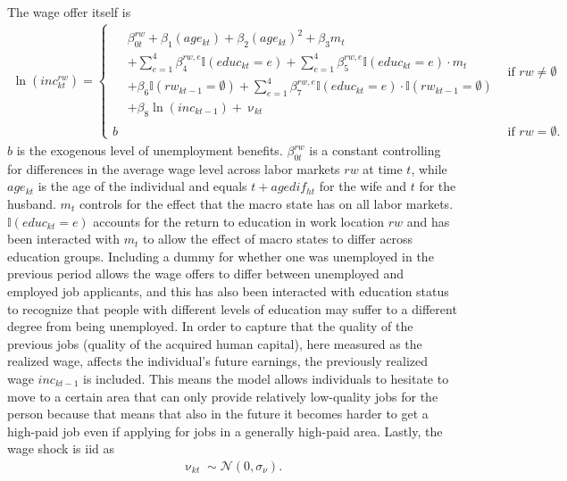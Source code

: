 The wage offer itself is
\begin{align}
\ln(inc_{kt}^{rw}) = 
\begin{cases} 
    \!\begin{aligned}%
       & \beta_{0t}^{rw} +\beta_1 (age_{kt}) + \beta_2(age_{kt})^2 + \beta_3 m_t \\
       & + \sum_{e=1}^{4}{\beta_4^{rw,e} \mathbb{I}{(educ_{kt}=e)}} + \sum_{e=1}^{4}{\beta_5^{rw,e} \mathbb{I}{(educ_{kt}=e)}\cdot m_t} \\
       & + \beta_6\mathbb{I}{(rw_{kt-1}=\emptyset)} + \sum_{e=1}^{4}{\beta_7^{rw,e} \mathbb{I}{(educ_{kt}=e)}\cdot \mathbb{I}{(rw_{kt-1}=\emptyset)}} \\
       & +\beta_8 \ln(inc_{kt-1}) + \upnu_{kt} 
    \end{aligned}           &  \text{if } rw\neq\emptyset \\%
    b & \text{if } rw=\emptyset. 
\end{cases}
\label{eq:inc}
\end{align}
$b$ is the exogenous level of unemployment benefits. $\beta_{0t}^{rw}$ is a constant controlling for differences in the average wage level across labor markets $rw$ at time $t$, while $age_{kt}$ is the age of the individual and equals $t+agedif_{ht}$ for the wife and $t$ for the husband. $m_t$ controls for the effect that the macro state has on all labor markets. $\mathbb{I}{(educ_{kt}=e)}$ accounts for the return to education in work location $rw$ and has been interacted with $m_t$ to allow the effect of macro states to differ across education groups. Including a dummy for whether one was unemployed in the previous period allows the wage offers to differ between unemployed and employed job applicants, and this has also been interacted with education status to recognize that people with different levels of education may suffer to a different degree from being unemployed. In order to capture that the quality of the previous jobs (quality of the acquired human capital), here measured as the realized wage, affects the individual's future earnings, the previously realized wage $inc_{kt-1}$ is included. This means the model allows individuals to hesitate to move to a certain area that can only provide relatively low-quality jobs for the person because that means that also in the future it becomes harder to get a high-paid job even if applying for jobs in a generally high-paid area. Lastly, the wage shock is iid as
\begin{align*}
\upnu_{kt} \sim \mathcal{N}(0,\sigma_{\nu}).
\end{align*}


